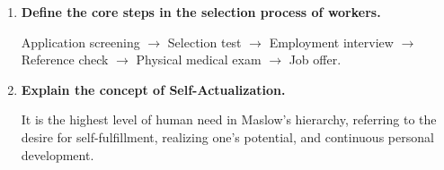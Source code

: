 \documentclass[12pt,a4paper]{article}
\newcommand{\Q}[1]{\textbf{#1}\par\noindent\ignorespaces}
\begin{document}
\begin{tcolorbox}[exambox, title={\textbf{Frequently Asked / Viva Questions}}]
\begin{enumerate}[topsep=0pt, label=\textbf{Q\arabic*.}, itemsep=5pt]
    Promoter profiles, technical feasibility (technology, plant layout), market feasibility (demand, competition), financial feasibility (cost, cash flows, NPV/IRR/BEP), and environmental impact clearances.
  \item \Q{Define the core steps in the selection process of workers.}
    Application screening $\rightarrow$ Selection test $\rightarrow$ Employment interview $\rightarrow$ Reference check $\rightarrow$ Physical medical exam $\rightarrow$ Job offer.
  \item \Q{Explain the concept of Self-Actualization.}
    It is the highest level of human need in Maslow's hierarchy, referring to the desire for self-fulfillment, realizing one's potential, and continuous personal development.
  \end{enumerate}
\end{tcolorbox}
\end{document}
